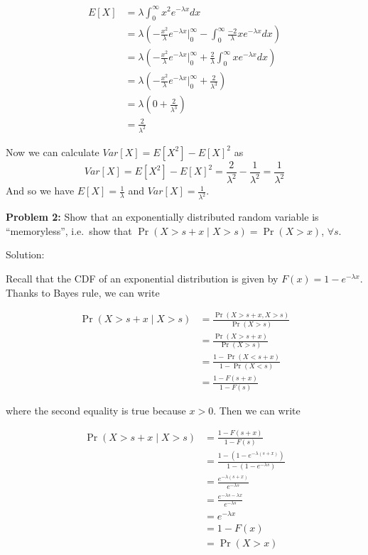 \documentclass[
  letterpaper,
  DIV=11,
  numbers=noendperiod]{scrreprt}
\begin{document}
\begin{align*}
    E[X] & = \lambda \int_0^\infty x^2 e^{-\lambda x} dx \\
    & = \lambda \left( -\frac{x^2}{\lambda} e^{-\lambda x} \bigg|_0^\infty  - \int_0^\infty \frac{-2}{\lambda} xe^{-\lambda x} dx \right) \\
    & = \lambda \left( -\frac{x^2}{\lambda} e^{-\lambda x} \bigg|_0^\infty  + \frac{2}{\lambda} \int_0^\infty  xe^{-\lambda x} dx \right) \\
    & = \lambda \left( -\frac{x^2}{\lambda} e^{-\lambda x} \bigg|_0^\infty  + \frac{2}{\lambda^3} \right)\\
    & = \lambda \left( 0  + \frac{2}{\lambda^3} \right) \\
    & = \frac{2}{\lambda^2}
\end{align*}

Now we can calculate \(Var[X] = E[X^2] - E[X]^2\) as \[
Var[X] = E[X^2] - E[X]^2 = \frac{2}{\lambda^2} - \frac{1}{\lambda^2} = \frac{1}{\lambda^2}
\] And so we have \(E[X] = \frac{1}{\lambda}\) and
\(Var[X] = \frac{1}{\lambda^2}\).

\textbf{Problem 2:} Show that an exponentially distributed random
variable is ``memoryless'', i.e.~show that
\(\Pr(X > s + x \mid X > s) = \Pr(X > x)\), \(\forall s\).

Solution:

Recall that the CDF of an exponential distribution is given by
\(F(x) = 1-e^{-\lambda x}\). Thanks to Bayes rule, we can write

\begin{align*}
    \Pr(X > s + x \mid X > s) & = \frac{\Pr(X > s + x , X > s)}{\Pr(X > s)} \\
    & = \frac{\Pr(X > s + x)}{\Pr(X > s)} \\
    & = \frac{1 - \Pr(X < s + x)}{1 - \Pr(X < s)} \\
    & = \frac{1 - F(s + x)}{1 - F(s)}
\end{align*}

where the second equality is true because \(x > 0\). Then we can write

\begin{align*}
    \Pr(X > s + x \mid X > s) & = \frac{1 - F(s + x)}{1 - F(s)} \\
    & = \frac{1 - \left(1 - e^{-\lambda(s + x)}\right)}{1 - \left(1 - e^{-\lambda s}\right)} \\
    & = \frac{e^{-\lambda(s + x)}}{e^{-\lambda s}} \\
    & = \frac{e^{-\lambda s - \lambda x}}{e^{-\lambda s}} \\
    & = e^{-\lambda x} \\
    & = 1 - F(x) \\
    & = \Pr(X > x)
\end{align*}
\end{document}
